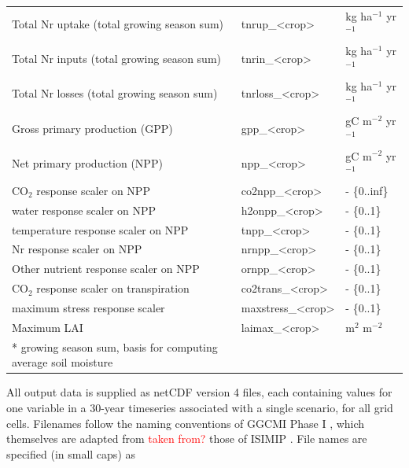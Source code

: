 \documentclass[gmd, manuscript]{copernicus} %
\begin{document}
{\begin{table}[]
\begin{tabular}{lll}
Total Nr uptake (total growing season sum)               & tnrup\_<crop>     & kg ha$^{-1}$ yr$^{-1}$              \\
Total Nr inputs (total growing season sum)               & tnrin\_<crop>     & kg ha$^{-1}$ yr$^{-1}$              \\
Total Nr losses (total growing season sum)               & tnrloss\_<crop>   & kg ha$^{-1}$ yr$^{-1}$              \\
Gross primary production (GPP)                           & gpp\_<crop>       & gC m$^{-2}$ yr$^{-1}$               \\
Net primary production (NPP)                             & npp\_<crop>       & gC m$^{-2}$ yr$^{-1}$               \\
CO$_2$ response scaler on NPP                            & co2npp\_<crop>    & - \{0..inf\}                \\
water response scaler on NPP                             & h2onpp\_<crop>    & - \{0..1\}                  \\
temperature response scaler on NPP                       & tnpp\_<crop>      & - \{0..1\}                  \\
Nr response scaler on NPP                                & nrnpp\_<crop>     & - \{0..1\}                  \\
Other nutrient response scaler on NPP                    & ornpp\_<crop>     & - \{0..1\}                  \\
CO$_2$ response scaler on transpiration                  & co2trans\_<crop>  & - \{0..1\}                  \\
maximum stress response scaler                           & maxstress\_<crop> & - \{0..1\}                  \\
Maximum LAI                                              & laimax\_<crop>    & m$^{2}$ m$^{-2}$           \\        
\bottomhline
* growing season sum, basis for computing average soil moisture & {} & {} \\
\end{tabular}
\end{table}

All output data is supplied as netCDF version 4 files, each containing values for one variable in a 30-year timeseries associated with a single scenario, for all grid cells. Filenames follow the naming conventions of GGCMI Phase I \citep{Elliott2015}, which themselves are adapted from \textcolor{red}{taken from?} those of ISIMIP \citep{frieler2017assessing}. File names are specified (in small caps) as 

}
\end{document}

